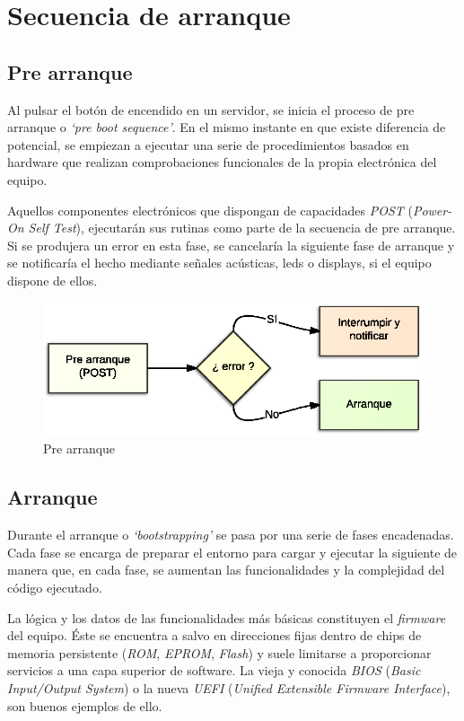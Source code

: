 \documentclass[a4paper,12pt,spanish,final]{epsc_tfc_pfc}
\begin{document}

\chapter{Secuencia de arranque}

\section{Pre arranque}
Al pulsar el botón de encendido en un servidor, se inicia el proceso de pre arranque o \emph{`pre boot sequence'}. En el mismo instante en que existe diferencia de potencial, se empiezan a ejecutar una serie de procedimientos basados en hardware que realizan comprobaciones funcionales de la propia electrónica del equipo.

Aquellos componentes electrónicos que dispongan de capacidades \emph{POST} (\emph{Power-On Self Test}), ejecutarán sus rutinas como parte de la secuencia de pre arranque. Si se produjera un error en esta fase, se cancelaría la siguiente fase de arranque y se notificaría el hecho mediante señales acústicas, leds o displays, si el equipo dispone de ellos.

\begin{figure}[h]
  \centering
    \includegraphics[scale=1]{pre_arranque}
      \caption{Pre arranque}
\end{figure}

\section{Arranque}
Durante el arranque o \emph{`bootstrapping'} se pasa por una serie de fases encadenadas. Cada fase se encarga de preparar el entorno para cargar y ejecutar la siguiente de manera que, en cada fase, se aumentan las funcionalidades y la complejidad del código ejecutado.

La lógica y los datos de las funcionalidades más básicas constituyen el \emph{firmware} del equipo. Éste se encuentra a salvo en direcciones fijas dentro de chips de memoria persistente (\emph{ROM}, \emph{EPROM}, \emph{Flash}) y suele limitarse a proporcionar servicios a una capa superior de software. La vieja y conocida \emph{BIOS} (\emph{Basic Input/Output System}) o la nueva \emph{UEFI} (\emph{Unified Extensible Firmware Interface}), son buenos ejemplos de ello.
\end{document}
